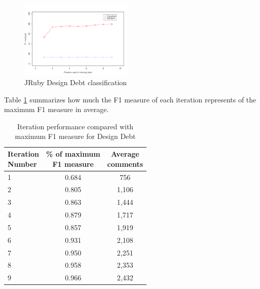 \begin{figure}[thb!]
  \centering
  \includegraphics[width=0.48\textwidth]{figures/design_jruby.pdf}
  \vspace{-3mm}
  \caption{JRuby Design Debt classification}
  \label{fig:design_jruby_result}
\end{figure}

Table \ref{tbl:design_iteration_performance} summarizes how much the F1 measure of each iteration represents of the maximum F1 measure in average.  

\begin{table}[!hbt]
    \begin{center}
        \caption{Iteration performance compared with maximum F1 measure for Design Debt}
        \label{tbl:design_iteration_performance}
        \begin{tabular}{l| c c }
        \toprule
        \thead{Iteration\\Number} & \thead{\% of maximum\\F1 measure} & \thead{Average\\comments} \\
        \midrule
         1  &  0.684  & 756 \\  
         2  &  0.805  & 1,106 \\  
         3  &  0.863  & 1,444 \\  
         4  &  0.879  & 1,717 \\  
         5  &  0.857  & 1,919 \\  
         6  &  0.931  & 2,108 \\  
         7  &  0.950  & 2,251 \\  
         8  &  0.958  & 2,353 \\  
         9  &  0.966  & 2,432 \\  
        \bottomrule
        \end{tabular}
    \end{center}    
\end{table}


\conclusionbox{}